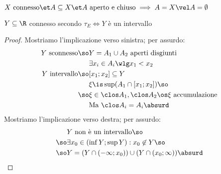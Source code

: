 \begin{prop}
$X\text{ connesso}\et A\subseteq X\et A\text{ aperto e chiuso}\implies A=X\vel A=\emptyset$
\end{prop}

\begin{prop}
$Y\subseteq\R$ connesso secondo $\tau_E\iff Y$ è un intervallo
\end{prop}
\begin{proof}
Mostriamo l'implicazione verso sinistra; per assurdo:
\begin{align*}
Y\text{ sconnesso}\so&Y=A_1\cup A_2\text{ aperti disgiunti}\\
&\exists x_i\in A_i\wlg x_1<x_2\\
Y\text{ intervallo}\so&[x_1;x_2]\subseteq Y\\
&\xi\is\sup(A_1\cap[x_1;x_2])\so\\
\so&\xi\in\clos A_1,\clos A_2\os\xi\text{ accumulazione}\\
&\text{Ma }\clos A_i=A_i\absurd
\end{align*}
Mostriamo l'implicazione verso destra; per assurdo:
\begin{align*}
&Y\text{ non è un intervallo}\so\\
\so&\exists x_0\in(\inf Y;\sup Y):x_0\not\in Y\so\\
\so&Y=(Y\cap(-\infty;x_0))\cup(Y\cap(x_0;\infty))\absurd \qedhere
\end{align*}
\end{proof}
